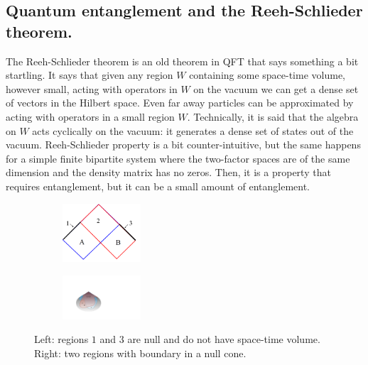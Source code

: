 \documentclass[12pt]{article}
\numberwithin{equation}{section}
\begin{document}
\subsection{Quantum entanglement and the Reeh-Schlieder theorem.}

The Reeh-Schlieder theorem is an old theorem in QFT that says something a bit startling. It says that given any region $W$ containing some space-time volume, however small, acting with operators in $W$ on the vacuum we can get a dense set of vectors in the Hilbert space. Even far away particles can be approximated by acting with operators in a small region $W$. Technically, it is said that the algebra on $W$ acts cyclically on the vacuum: it generates a dense set of states out of the vacuum. Reeh-Schlieder property is a bit counter-intuitive, but the same happens for a simple finite bipartite system where the two-factor spaces are of the same dimension and the density matrix has no zeros. Then, it is a property that requires entanglement, but it can be a small amount of entanglement.   

\begin{figure}[t]  
\begin{subfigure}
\centering
\hspace{1.3cm}\includegraphics[width=0.32\textwidth]{segmento.png}
\end{subfigure}
\hspace{2cm}
\begin{subfigure}
\centering
\includegraphics[width=0.32\textwidth]{enelcono.pdf}
\end{subfigure}
\captionsetup{width=0.9\textwidth}
\caption{Left: regions $1$ and $3$ are null and do not have space-time volume. Right: two regions with boundary in a null cone. }
\label{cono1}
\end{figure}  
\end{document}
